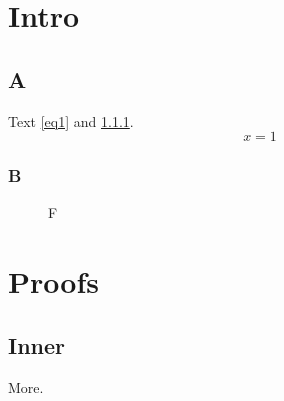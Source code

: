 \documentclass{scrbook}
\begin{document}
\chapter{Intro}
\section{A}
Text \ref{eq1} and \ref{sb}.
\begin{equation}x=1\label{eq1}\end{equation}
\subsection{B}\label{sb}
\begin{figure}\caption{F}\end{figure}
\appendix
\chapter{Proofs}
\section{Inner}
More.
\end{document}

